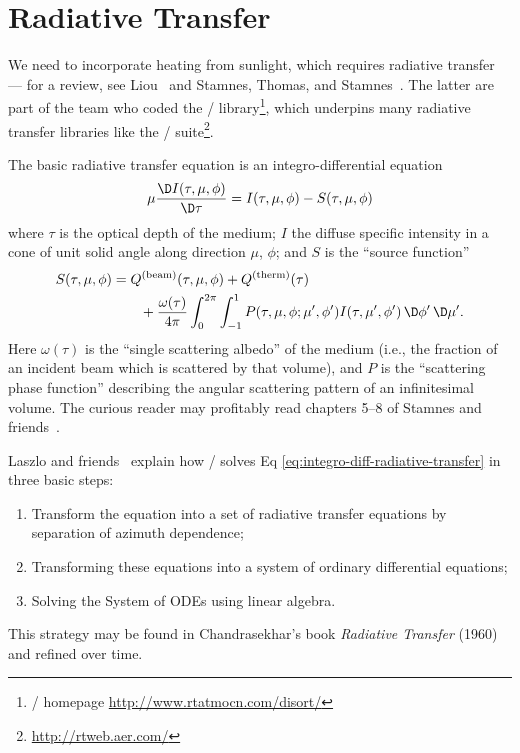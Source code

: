\section{Radiative Transfer}

We need to incorporate heating from sunlight, which requires radiative
transfer --- for a review, see Liou~\cite{liou2002introduction} and
Stamnes, Thomas, and Stamnes~\cite{stamnes_thomas_stamnes_2017}.
The latter are part of the team who coded the \DISORT/\index{\DISORT/}
library\footnote{\DISORT/ homepage \url{http://www.rtatmocn.com/disort/}},
which underpins many radiative transfer libraries like the
\RRTM/\index{\RRTM/} suite\footnote{\url{http://rtweb.aer.com/}}.

The basic radiative transfer equation is an integro-differential
equation
\begin{equation}\label{eq:integro-diff-radiative-transfer}
  \mu\frac{\D I(\tau,\mu,\phi)}{\D\tau}
  = I(\tau, \mu, \phi) - S(\tau, \mu, \phi)
\end{equation}
where $\tau$ is the optical depth of the medium; $I$ the diffuse
specific intensity in a cone of unit solid angle along direction $\mu$,
$\phi$; and $S$ is the ``source function''
\begin{equation}
  \begin{split}
    S(\tau, \mu, \phi) &= Q^{\text{(beam)}}(\tau,\mu,\phi)  + Q^{\text{(therm)}}(\tau) \\
    &\qquad + \frac{\omega(\tau)}{4\pi}
  \int^{2\pi}_{0}\int^{1}_{-1} P(\tau,\mu,\phi;\mu',\phi')I(\tau,\mu',\phi')\,\D\phi'\,\D\mu'.
  \end{split}
\end{equation}
Here $\omega(\tau)$ is the ``single scattering albedo'' of the medium
(i.e., the fraction of an incident beam which is scattered by that
volume), and $P$ is the ``scattering phase function'' describing the
angular scattering pattern of an infinitesimal volume. The curious
reader may profitably read chapters 5--8 of Stamnes and
friends~\cite{stamnes_thomas_stamnes_2017}.

\begin{note}
Laszlo and friends~\cite{Laszlo2016} explain how \DISORT/ solves Eq
\eqref{eq:integro-diff-radiative-transfer} in three basic steps:
\begin{enumerate}
\item Transform the equation into a set of radiative transfer equations
  by separation of azimuth dependence;
\item Transforming these equations into a system of ordinary
  differential equations;
\item Solving the System of ODEs using linear algebra.
\end{enumerate}
This strategy may be found in Chandrasekhar's book
\emph{Radiative Transfer} (1960) and refined over time.
\end{note}


